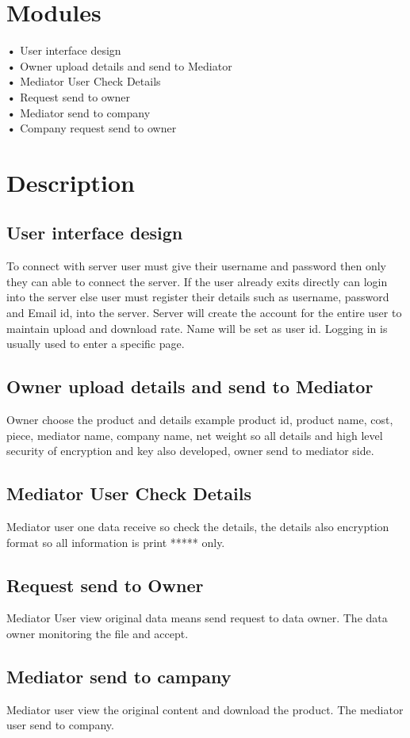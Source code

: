 \documentclass[BTech]{srmuthesis}
\begin{document}
\section{Modules}
\textbf{•} User interface design \\
\textbf{•} Owner upload details and send to Mediator \\
\textbf{•} Mediator User Check Details \\
\textbf{•} Request send to owner \\
\textbf{•} Mediator send to company \\
\textbf{•} Company request send to owner \\
\section{Description}
\subsection{User interface design}
To connect with server user must give their username and password then only they can able to connect the server. If the user already exits directly can login into the server else user must register their details such as username, password and Email id, into the server. Server will create the account for the entire user to maintain upload and download rate. Name will be set as user id. Logging in is usually used to enter a specific page.
\subsection{Owner upload details and send to Mediator}
Owner choose the product and details example product id, product name, cost, piece, mediator name, company name, net weight so all details and high level security of encryption and key also developed,  owner  send to mediator side. 
\subsection{Mediator User Check Details}
Mediator user one data receive so check the details, the details also encryption format so all information is print ***** only.
\subsection{Request send to Owner} 
Mediator User view original data means send request  to data owner. The data owner monitoring the file and accept.
\subsection{Mediator send to campany}
Mediator user view the original content and download the product. The mediator user send to company.
\end{document}
